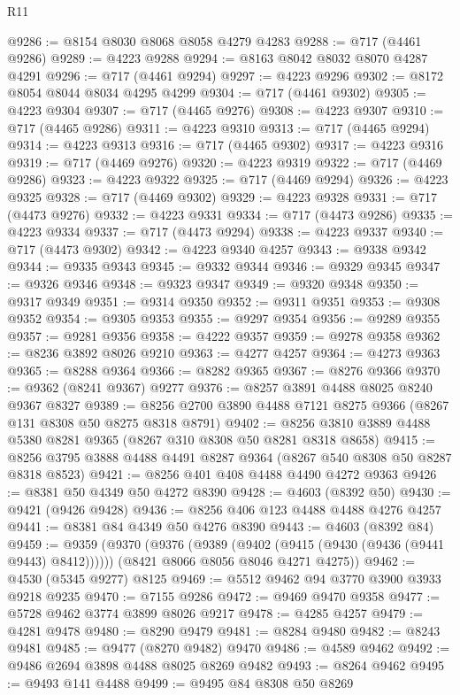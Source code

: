 \begin{lexlean}{R11}
\begin{coremodule}
@9286 := @8154 @8030 @8068 @8058 @4279 @4283
@9288 := @717 (@4461 @9286)
@9289 := @4223 @9288
@9294 := @8163 @8042 @8032 @8070 @4287 @4291
@9296 := @717 (@4461 @9294)
@9297 := @4223 @9296
@9302 := @8172 @8054 @8044 @8034 @4295 @4299
@9304 := @717 (@4461 @9302)
@9305 := @4223 @9304
@9307 := @717 (@4465 @9276)
@9308 := @4223 @9307
@9310 := @717 (@4465 @9286)
@9311 := @4223 @9310
@9313 := @717 (@4465 @9294)
@9314 := @4223 @9313
@9316 := @717 (@4465 @9302)
@9317 := @4223 @9316
@9319 := @717 (@4469 @9276)
@9320 := @4223 @9319
@9322 := @717 (@4469 @9286)
@9323 := @4223 @9322
@9325 := @717 (@4469 @9294)
@9326 := @4223 @9325
@9328 := @717 (@4469 @9302)
@9329 := @4223 @9328
@9331 := @717 (@4473 @9276)
@9332 := @4223 @9331
@9334 := @717 (@4473 @9286)
@9335 := @4223 @9334
@9337 := @717 (@4473 @9294)
@9338 := @4223 @9337
@9340 := @717 (@4473 @9302)
@9342 := @4223 @9340 @4257
@9343 := @9338 @9342
@9344 := @9335 @9343
@9345 := @9332 @9344
@9346 := @9329 @9345
@9347 := @9326 @9346
@9348 := @9323 @9347
@9349 := @9320 @9348
@9350 := @9317 @9349
@9351 := @9314 @9350
@9352 := @9311 @9351
@9353 := @9308 @9352
@9354 := @9305 @9353
@9355 := @9297 @9354
@9356 := @9289 @9355
@9357 := @9281 @9356
@9358 := @4222 @9357
@9359 := @9278 @9358
@9362 := @8236 @3892 @8026 @9210
@9363 := @4277 @4257
@9364 := @4273 @9363
@9365 := @8288 @9364
@9366 := @8282 @9365
@9367 := @8276 @9366
@9370 := @9362 (@8241 @9367) @9277
@9376 := @8257 @3891 @4488 @8025 @8240 @9367 @8327
@9389 := @8256 @2700 @3890 @4488 @7121 @8275 @9366 (@8267 @131 @8308 @50 @8275 @8318 @8791)
@9402 := @8256 @3810 @3889 @4488 @5380 @8281 @9365 (@8267 @310 @8308 @50 @8281 @8318 @8658)
@9415 := @8256 @3795 @3888 @4488 @4491 @8287 @9364 (@8267 @540 @8308 @50 @8287 @8318 @8523)
@9421 := @8256 @401 @408 @4488 @4490 @4272 @9363
@9426 := @8381 @50 @4349 @50 @4272 @8390
@9428 := @4603 (@8392 @50)
@9430 := @9421 (@9426 @9428)
@9436 := @8256 @406 @123 @4488 @4488 @4276 @4257
@9441 := @8381 @84 @4349 @50 @4276 @8390
@9443 := @4603 (@8392 @84)
@9459 := @9359
    (@9370
      (@9376 (@9389 (@9402 (@9415 (@9430 (@9436 (@9441 @9443) @8412))))))
      (@8421 @8066 @8056 @8046 @4271 @4275))
@9462 := @4530 (@5345 @9277) @8125
@9469 := @5512 @9462 @94 @3770 @3900 @3933 @9218 @9235
@9470 := @7155 @9286
@9472 := @9469 @9470 @9358
@9477 := @5728 @9462 @3774 @3899 @8026 @9217
@9478 := @4285 @4257
@9479 := @4281 @9478
@9480 := @8290 @9479
@9481 := @8284 @9480
@9482 := @8243 @9481
@9485 := @9477 (@8270 @9482) @9470
@9486 := @4589 @9462
@9492 := @9486 @2694 @3898 @4488 @8025 @8269 @9482
@9493 := @8264 @9462
@9495 := @9493 @141 @4488
@9499 := @9495 @84 @8308 @50 @8269

\end{coremodule}
\end{lexlean}
